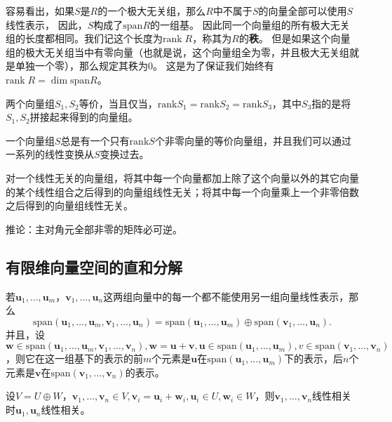 \documentclass[UTF8]{ctexart}
\theoremstyle{definition}
\begin{document}
容易看出，如果$S$是$R$的一个极大无关组，那么$R$中不属于$S$的向量全部可以使用$S$线性表示，
因此，$S$构成了$\mathrm{span} R$的一组基。
因此同一个向量组的所有极大无关组的长度都相同。我们记这个长度为$\mathrm{rank}\; R$，称其为$R$的\textbf{秩}。
但是如果这个向量组的极大无关组当中有零向量（也就是说，这个向量组全为零，并且极大无关组就是单独一个零），那么规定其秩为0。
这是为了保证我们始终有$\mathrm{rank} \; R = \dim \mathrm{span} R$。

两个向量组$S_1, S_2$等价，当且仅当，$\mathrm{rank}S_1 = \mathrm{rank}S_2 = \mathrm{rank}S_3$，其中$S_3$指的是将$S_1, S_2$拼接起来得到的向量组。

一个向量组$S$总是有一个只有$\mathrm{rank}S$个非零向量的等价向量组，并且我们可以通过一系列的线性变换从$S$变换过去。

对一个线性无关的向量组，将其中每一个向量都加上除了这个向量以外的其它向量的某个线性组合之后得到的向量组线性无关；将其中每一个向量乘上一个非零倍数之后得到的向量组线性无关。

推论：主对角元全部非零的矩阵必可逆。

\hypertarget{ux6709ux9650ux7ef4ux5411ux91cfux7a7aux95f4ux7684ux76f4ux548cux5206ux89e3}{%
\subsection{有限维向量空间的直和分解}\label{ux6709ux9650ux7ef4ux5411ux91cfux7a7aux95f4ux7684ux76f4ux548cux5206ux89e3}}

若$\boldsymbol{u}_1, \ldots, \boldsymbol{u}_m$，$\boldsymbol{v}_1, \ldots, \boldsymbol{u}_n$这两组向量中的每一个都不能使用另一组向量线性表示，那么
\[
\mathrm{span}(\boldsymbol{u}_1, \ldots, \boldsymbol{u}_m, \boldsymbol{v}_1, \ldots, \boldsymbol{u}_n) = \mathrm{span}(\boldsymbol{u}_1, \ldots, \boldsymbol{u}_m) \oplus \mathrm{span}(\boldsymbol{v}_1, \ldots, \boldsymbol{u}_n).
\]
并且，设$\boldsymbol{w} \in \mathrm{span}(\boldsymbol{u}_1, \ldots, \boldsymbol{u}_m, \boldsymbol{v}_1, \ldots, \boldsymbol{v}_n), \boldsymbol{w} = \boldsymbol{u} + \boldsymbol{v}, \boldsymbol{u} \in \mathrm{span}(\boldsymbol{u}_1, \ldots, \boldsymbol{u}_m), v \in \mathrm{span}(\boldsymbol{v}_1, \ldots, \boldsymbol{v}_n)$，则它在这一组基下的表示的前$m$个元素是$\boldsymbol{u}$在$\mathrm{span}(\boldsymbol{u}_1, \ldots, \boldsymbol{u}_m)$下的表示，后$n$个元素是$\boldsymbol{v}$在$\mathrm{span}(\boldsymbol{v}_1, \ldots, \boldsymbol{v}_n)$的表示。

设$V=U\oplus W$，$\boldsymbol{v}_1, \ldots, \boldsymbol{v}_n \in V, \boldsymbol{v}_i = \boldsymbol{u}_i + \boldsymbol{w}_i, \boldsymbol{u}_i \in U, \boldsymbol{w}_i \in W$，则$\boldsymbol{v}_1, \ldots, \boldsymbol{v}_n$线性相关时$\boldsymbol{u}_1, \boldsymbol{u}_n$线性相关。
\end{document}
